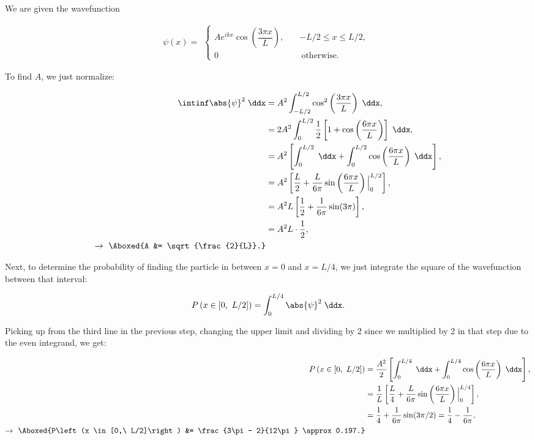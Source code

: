 \section{}

We are given the wavefunction

\renewcommand{\arraystretch}{1.3}
\begin{equation}
    \psi(x) = 
        \begin{alignedat}{1}
        \begin{cases}
            Ae^{ikx} \cos\left(\dfrac{3\pi x}{L}\right),\quad & -L/2 \leq x \leq L/2, \\
            0 & \ \text{otherwise}.
        \end{cases}
        \end{alignedat}
\end{equation}
\renewcommand{\arraystretch}{1}

To find $A$, we just normalize:

\begin{align*}
    \intinf \abs{\psi}^2 \;\ddx &= A^2 \int_{-L/2}^{L/2} \cos^2 \left(\frac{3\pi x}{L}\right) \;\ddx, \\
    &= 2A^2 \int_0^{L/2} \frac{1}{2} \left[1 + \cos\left(\frac{6\pi x}{L}\right)\right] \;\ddx, \\
    &= A^2 \left[\int_0^{L/2} \;\ddx + \int_0^{L/2} \cos\left(\frac{6\pi x}{L}\right) \;\ddx\right], \\
    &= A^2 \left[\frac{L}{2} + \frac{L}{6\pi} \sin\left(\frac{6\pi x}{L}\right) \Big|_0^{L/2}\right], \\
    &= A^2L \left[\frac{1}{2} + \frac{1}{6\pi} \sin(3\pi)\right], \\
    &= A^2 L \cdot \frac{1}{2}, \\
    \rightarrow\ \Aboxed{A &= \sqrt{\frac{2}{L}}.}
\end{align*}

Next, to determine the probability of finding the particle in between $x=0$ and $x=L/4$, we just integrate the square of the wavefunction between that interval:

\begin{equation*}
    P\left(x \in [0,\ L/2]\right) = \int_0^{L/4} \abs{\psi}^2 \;\ddx.
\end{equation*}

Picking up from the third line in the previous step, changing the upper limit and dividing by 2 since we multiplied by 2 in that step due to the even integrand, we get:

\begin{align*}
    P\left(x \in [0,\ L/2]\right) &= \frac{A^2}{2} \left[\int_0^{L/4} \;\ddx + \int_0^{L/4} \cos\left(\frac{6\pi x}{L}\right) \;\ddx\right], \\
    &= \frac{1}{L} \left[\frac{L}{4} + \frac{L}{6\pi} \sin\left(\frac{6\pi x}{L}\right)\Big|_0^{L/4}\right], \\
    &= \frac{1}{4} + \frac{1}{6\pi} \sin(3\pi/2) = \frac{1}{4} - \frac{1}{6\pi}, \\
    \rightarrow\ \Aboxed{P\left(x \in [0,\ L/2]\right) &= \frac{3\pi - 2}{12\pi} \approx 0.197.}
\end{align*}